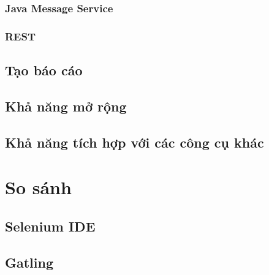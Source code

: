 \documentclass[10pt]{report}
\begin{document}
\subsection{Java Message Service}

\subsection{REST}

\section{Tạo báo cáo}

\section{Khả năng mở rộng}

\section{Khả năng tích hợp với các công cụ khác}

\chapter{So sánh}

\section{Selenium IDE}

\section{Gatling}
\end{document}
